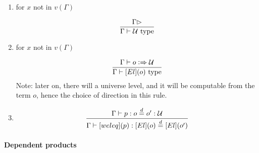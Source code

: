\documentclass[11pt]{article}
\newcommand{\eqd}{\stackrel{d}{=}}
\newcommand{\Eu}{{\cal U}}
\newcommand{\synth}{\vcentcolon\Rightarrow}
\newcommand{\Type}{\mathop{{\, \rm type}}}
\begin{document}
\begin{enumerate}
\item for $x$ not in $v(\Gamma)$

$$\frac{\Gamma\rhd}{\Gamma \vdash \Eu\Type}$$

\item for $x$ not in $v(\Gamma)$

$$\frac{\Gamma\vdash o \synth \Eu}{\Gamma \vdash [El](o)\Type}$$
Note: later on, there will a universe level, and it will be computable from the
term $o$, hence the choice of direction in this rule.

\item 

$$\frac{\Gamma\vdash p : o \eqd o' : \Eu}{\Gamma\vdash [weleq](p) : [El](o) \eqd [El](o')}$$

\end{enumerate}







\paragraph{Dependent products}
\end{document}
